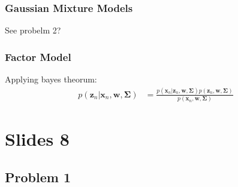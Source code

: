 \documentclass[a4paper,12pt]{article}
\begin{document}
\subsubsection*{Gaussian Mixture Models}

See probelm 2?


\subsubsection*{Factor Model}

Applying bayes theorum:
%
\begin{align*}
p( \bm{z}_n | \bm{x}_n, \bm{w}, \bm{\Sigma} ) &= \frac{p(\bm{x}_n | \bm{z}_n, \bm{w}, \bm{\Sigma}) p(\bm{z}_n, \bm{w}, \bm{\Sigma})} {p(\bm{x}_n, \bm{w}, \bm{\Sigma})}
\end{align*}
%

\section*{Slides 8}

\subsection*{Problem 1}
\end{document}
